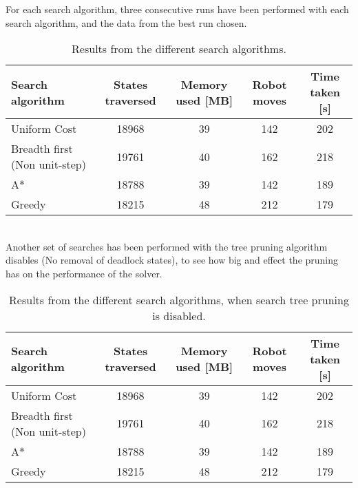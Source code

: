 For each search algorithm, three consecutive runs have been performed with each search algorithm, and the data from the best run chosen.\\

\begin{table}[h!]
	\centering
	\begin{tabular}{| l | c | c | c | c | }
		\hline
			Search algorithm	& States traversed & Memory used [MB] & Robot moves & Time taken [s]\\ \hline
	    	Uniform Cost & 18968 			& 39 		 & 142 	& 202\\\hline
		    Breadth first (Non unit-step)	& 19761 			& 40 		 & 162 	& 218\\\hline
		    A*		& 18788 			& 39 		 & 142 	& 189 \\\hline
	    	Greedy 		& 18215 			& 48 		 & 212 	& 179 \\
		\hline
	\end{tabular}
	\label{tbl:searchresults}
	\caption{Results from the different search algorithms.}
\end{table}
\\
Another set of searches has been performed with the tree pruning algorithm disables (No removal of deadlock states), to see how big and effect the pruning has on the performance of the solver.\\
\begin{table}[h!]
	\centering
	\begin{tabular}{| l | c | c | c | c | }
		\hline
			Search algorithm	& States traversed & Memory used [MB] & Robot moves & Time taken [s]\\ \hline
	    	Uniform Cost & 18968 			& 39 		 & 142 	& 202\\\hline
		    Breadth first (Non unit-step)	& 19761 			& 40 		 & 162 	& 218\\\hline
		    A*		& 18788 			& 39 		 & 142 	& 189 \\\hline
	    	Greedy 		& 18215 			& 48 		 & 212 	& 179 \\
		\hline
	\end{tabular}
	\label{tbl:searchresultsnoprun}
	\caption{Results from the different search algorithms, when search tree pruning is disabled.}
\end{table}


